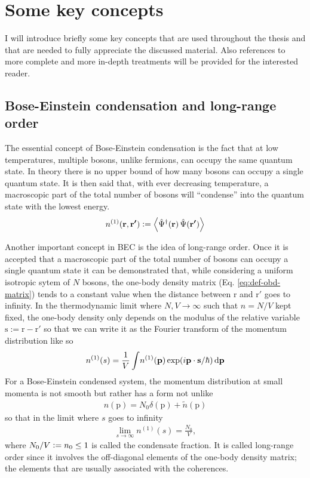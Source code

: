 \documentclass[11pt,a4paper,twoside]{article}
\renewcommand{\vec}[1]{\bm{\mathrm{#1}}}
\begin{document}
	\newpage
	\section{Some key concepts}
	I will introduce briefly some key concepts that are used throughout the thesis and that are needed to fully appreciate the discussed material. Also references to more complete and more in-depth treatments will be provided for the interested reader.
		
		\subsection{Bose-Einstein condensation and long-range order}
			The essential concept of Bose-Einstein condensation is the fact that at low temperatures, multiple bosons, unlike fermions, can occupy the same quantum state. In theory there is no upper bound of how many bosons can occupy a single quantum state. It is then said that, with ever decreasing temperature, a macroscopic part of the total number of bosons will ``condense'' into the quantum state with the lowest energy.\\
			
			\begin{align}
				n^{(1)}(\vec{r},\vec{r'}) \vcentcolon= \expectationvalue{\hat{\Psi}^\dagger(\vec{r})\,\hat{\Psi}(\vec{r'})}\label{eq:def-obd-matrix}
			\end{align}
			
			Another important concept in BEC is the idea of long-range order. Once it is accepted that a macroscopic part of the total number of bosons can occupy a single quantum state it can be demonstrated that, while considering a uniform isotropic sytem of $N$ bosons, the one-body density matrix (Eq. \ref{eq:def-obd-matrix}) tends to a constant value when the distance between $\vec{r}$ and $\vec{r}'$ goes to infinity. In the thermodynamic limit where $N,V\rightarrow\infty$ such that $n=N/V$ kept fixed, the one-body density only depends on the modulus of the relative variable $\vec{s}:=\vec{r}-\vec{r}'$ so that we can write it as the Fourier transform of the momentum distribution like so
			\begin{align}
				n^{(1)}(s) = \frac{1}{V}\int \! n^{(1)}\qty(\vec{p})\exp(i\vec{p}\cdot\vec{s}/\hbar)\,\mathrm{d}\vec{p}
			\end{align}
			For a Bose-Einstein condensed system, the momentum distribution at small momenta is not smooth but rather has a form not unlike
			\begin{align}
				n(\vec{p})=N_0\delta(\vec{p})+\tilde{n}(\vec{p})
			\end{align}
			so that in the limit where $s$ goes to infinity
			\begin{align}
				\lim_{s\rightarrow\infty}n^{(1)}(s)=\frac{N_0}{V},
			\end{align}
			where $N_0/V \vcentcolon= n_0\leq 1$ is called the condensate fraction. It is called long-range order since it involves the off-diagonal elements of the one-body density matrix; the elements that are usually associated with the coherences.\\
			
\end{document}

